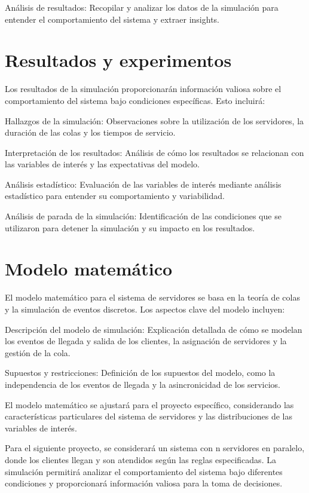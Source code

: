 \documentclass[article]{amsart}
\begin{document}
    Análisis de resultados: Recopilar y analizar los datos de la simulación para entender el comportamiento del sistema y extraer insights.

\section{Resultados y experimentos}

Los resultados de la simulación proporcionarán información valiosa sobre el comportamiento del sistema bajo condiciones específicas. Esto incluirá:

    Hallazgos de la simulación: Observaciones sobre la utilización de los servidores, la duración de las colas y los tiempos de servicio.

    Interpretación de los resultados: Análisis de cómo los resultados se relacionan con las variables de interés y las expectativas del modelo.

    Análisis estadístico: Evaluación de las variables de interés mediante análisis estadístico para entender su comportamiento y variabilidad.

    Análisis de parada de la simulación: Identificación de las condiciones que se utilizaron para detener la simulación y su impacto en los resultados.

\section{Modelo matem\'atico}

El modelo matemático para el sistema de servidores se basa en la teoría de colas y la simulación de eventos discretos. Los aspectos clave del modelo incluyen:

    Descripción del modelo de simulación: Explicación detallada de cómo se modelan los eventos de llegada y salida de los clientes, la asignación de servidores y la gestión de la cola.

    Supuestos y restricciones: Definición de los supuestos del modelo, como la independencia de los eventos de llegada y la asincronicidad de los servicios.

El modelo matemático se ajustará para el proyecto específico, considerando las características particulares del sistema de servidores y las distribuciones de las variables de interés.

Para el siguiente proyecto, se considerará un sistema con n servidores en paralelo, donde los clientes llegan y son atendidos según las reglas especificadas. La simulación permitirá analizar el comportamiento del sistema bajo diferentes condiciones y proporcionará información valiosa para la toma de decisiones.
\end{document}
